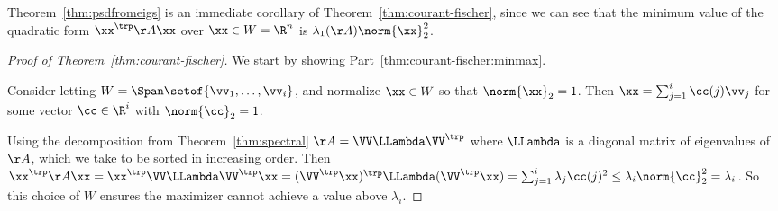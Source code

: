 Theorem~\ref{thm:psdfromeigs} is an immediate corollary of
Theorem~\ref{thm:courant-fischer}, since we can see that the minimum value
of
the quadratic form $\xx^\trp \AA \xx$ over $\xx \in W = \R^n$ is
$\lambda_1(\AA)\norm{\xx}_2^2$.
\begin{proof}[Proof of Theorem~\ref{thm:courant-fischer}]

We start by showing Part~\ref{thm:courant-fischer:minmax}.

Consider letting $W = \Span\setof{\vv_1, \ldots,
  \vv_i}
$, and normalize $\xx \in W$ so that $\norm{\xx}_2 = 1$. Then $\xx = \sum_{j = 1}^i
\cc(j) \vv_j$ for some vector $\cc \in \R^i$ with $\norm{\cc}_2 = 1$.

Using the decomposition from Theorem~\ref{thm:spectral} $\AA=
\VV \LLambda\VV^\trp$ where $\LLambda$ is a diagonal matrix of
eigenvalues of $\AA$, which we take to be sorted in increasing order.
Then $\xx^\trp \AA\xx= \xx^\trp \VV
\LLambda\VV^\trp\xx= (\VV^\trp\xx)^\trp  \LLambda(\VV^\trp\xx) = \sum_{j = 1}^i
\lambda_j \cc(j)^2 \leq \lambda_i \norm{\cc}_2^2 = \lambda_i $.
So this choice of $W$ ensures the maximizer cannot achieve a value above $\lambda_i$.


\end{proof}

